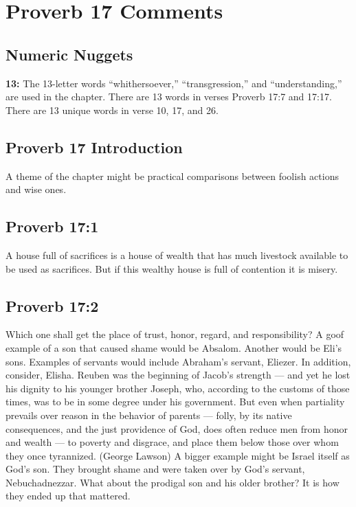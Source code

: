 \section{Proverb 17 Comments}

\subsection{Numeric Nuggets}
\textbf{13:} The 13-letter words ``whithersoever,'' ``transgression,'' and ``understanding,'' are used in the chapter. There are 13 words in verses Proverb 17:7 and 17:17. There are 13 unique words in verse 10, 17, and 26.

\subsection{Proverb 17 Introduction}
A theme of the chapter might be practical comparisons between foolish actions and wise ones.

\subsection{Proverb 17:1}
A house full of sacrifices is a house of wealth that has much livestock available to be used as sacrifices. But if this wealthy house is full of contention it is misery.

\subsection{Proverb 17:2}
Which one shall get the place of trust, honor, regard, and responsibility? A goof example of a son that caused shame would be Absalom. Another would be Eli's sons. Examples of servants would include Abraham's servant, Eliezer. In addition, consider, Elisha.  Reuben was the beginning of Jacob's strength — and yet he lost his dignity to his younger brother Joseph, who, according to the customs of those times, was to be in some degree under his government. But even when partiality prevails over reason in the behavior of parents — folly, by its native consequences, and the just providence of God, does often reduce men from honor and wealth — to poverty and disgrace, and place them below those over whom they once tyrannized. (George Lawson) A bigger example might be Israel itself as God's son. They brought shame and were taken over by God's servant, Nebuchadnezzar. What about the prodigal son and his older brother? It is how they ended up that mattered. %

